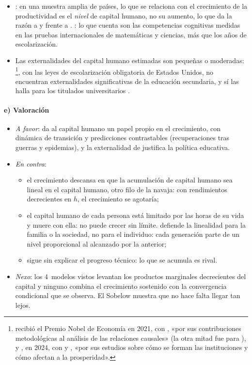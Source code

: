 \documentclass[11pt]{article}
\begin{document}
\begin{itemize}
\item \textcite{BenhabibSpiegel1994Role}: en una muestra amplia de países, lo que se relaciona con el crecimiento de la productividad es el \emph{nivel} de capital humano, no su aumento, lo que da la razón a  y  frente a . \textcite{HanushekWoessmann2008Role}: lo que cuenta son las competencias cognitivas medidas en las pruebas internacionales de matemáticas y ciencias, más que los años de escolarización.
\item Las externalidades del capital humano estimadas son pequeñas o moderadas: \textcite{AcemogluAngrist2000How}\footnote{ recibió el Premio Nobel de Economía en 2021, con , «por sus contribuciones metodológicas al análisis de las relaciones causales» (la otra mitad fue para )\nocite{Nobel2021CardAngristImbens}, y , en 2024, con  y , «por sus estudios sobre cómo se forman las instituciones y cómo afectan a la prosperidad»\nocite{NobelPrize2024}.}, con las leyes de escolarización obligatoria de Estados Unidos, no encuentran externalidades significativas de la educación secundaria, y \textcite{Moretti2004Estimating} sí las halla para los titulados universitarios .
\end{itemize}

\paragraph{e) Valoración}

\begin{itemize}
\item \emph{A favor}: da al capital humano un papel propio en el crecimiento, con dinámica de transición y predicciones contrastables (recuperaciones tras guerras y epidemias), y la externalidad de  justifica la política educativa.
\item \emph{En contra}:
  \begin{itemize}
  \item el crecimiento descansa en que la acumulación de capital humano sea lineal en el capital humano, otro filo de la navaja: con rendimientos decrecientes en $h$, el crecimiento se agotaría;
  \item el capital humano de cada persona está limitado por las horas de su vida y muere con ella: no puede crecer sin límite\nocite{Acemoglu2009}.  defiende la linealidad para la familia o la sociedad, no para el individuo: cada generación parte de un nivel proporcional al alcanzado por la anterior\nocite{Lucas1988};
  \item sigue sin explicar el progreso técnico: lo que se acumula es rival.
  \end{itemize}
\item \emph{Nexo}: los 4~modelos vistos levantan los productos marginales decrecientes del capital y ninguno combina el crecimiento sostenido con la convergencia condicional que se observa. El Sobelow muestra que no hace falta llegar tan lejos.
\end{itemize}
\end{document}
